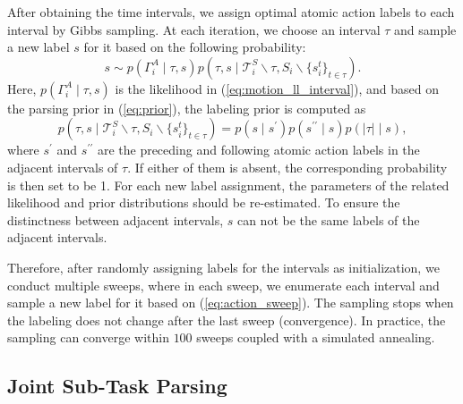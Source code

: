 \documentclass[letterpaper, 10 pt, conference]{ieeeconf}  %
\begin{document}
After obtaining the time intervals, we assign optimal atomic action labels to each interval by Gibbs sampling. At each iteration, we choose an interval $\tau$ and sample a new label $s$ for it based on the following probability:
\begin{equation}
s \sim p(\Gamma_i^A \mid \tau, s)p(\tau, s \mid \mathcal{T}_i^S \backslash	 \tau, S_i \backslash \{s_i^t\}_{t \in \tau}).
\label{eq:action_sweep}
\end{equation}
Here, $p(\Gamma_i^A \mid \tau, s)$ is the likelihood in (\ref{eq:motion_ll_interval}), and based on the parsing prior in (\ref{eq:prior}), the labeling prior is computed as
\begin{equation}
p(\tau, s \mid \mathcal{T}_i^S \backslash \tau, S_i \backslash \{s_i^t\}_{t \in \tau}) = p(s \mid s^\prime) p(s^{\prime\prime} \mid s)p(|\tau| \mid s),
\end{equation}
where $s^\prime$ and $s^{\prime\prime}$ are the preceding and following atomic action labels in the adjacent intervals of $\tau$. If either of them is absent, the corresponding probability is then set to be 1. For each new label assignment, the parameters of the related likelihood and prior distributions should be re-estimated. To ensure the distinctness between adjacent intervals, $s$ can not be the same labels of the adjacent intervals. 

Therefore, after randomly assigning labels for the intervals as initialization, we conduct multiple sweeps, where in each sweep, we enumerate each interval and sample a new label for it based on (\ref{eq:action_sweep}). The sampling stops when the labeling does not change after the last sweep (convergence). In practice, the sampling can converge within $100$ sweeps coupled with a simulated annealing.

\subsection{Joint Sub-Task Parsing}
\end{document}
